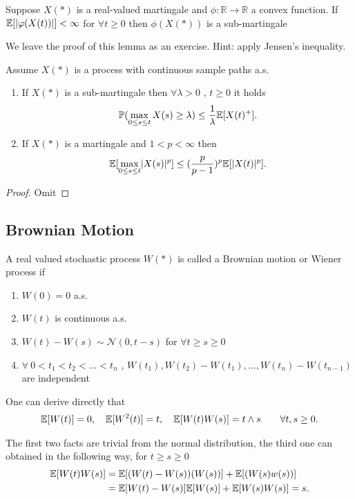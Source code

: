 \begin{lemma}
  Suppose $X(*)$ is a real-valued martingale and $\phi  : \mathbb{R} \to  \mathbb{R}$ a convex function.
  If $\mathbb{E}[\lvert\varphi(X(t))\rvert] < \infty $ for $\forall  t\ge 0$ then $\phi(X(*))$ is a sub-martingale
\end{lemma}
We leave the proof of this lemma as an exercise. Hint: apply Jensen's inequality.
\vskip5mm
\begin{theorem}
 Assume $X(*)$  is a process with continuous sample paths a.s. 
 \begin{enumerate}
   \item If $X(*)$ is a sub-martingale then $\forall  \lambda > 0$ , $t \ge 0$ it holds 
     \begin{align*}
       \mathbb{P}(\max_{0\le s\le t} X(s) \ge \lambda ) \le  \frac{1}{\lambda }\mathbb{E}[X(t)^{+} ]
     .\end{align*}
    \item If $X(*)$ is a martingale and $1 < p < \infty$ then
      \begin{align*}
        \mathbb{E}[\max_{0\le s\le t} \lvert X(s) \rvert^{p} ] \le (\frac{p}{p-1})^{p} \mathbb{E}[\lvert X(t)\rvert^{p} ]
      .\end{align*}
 \end{enumerate}
\end{theorem}
\begin{proof}
 Omit 
\end{proof}
\subsection{Brownian Motion}
\begin{definition}
 A real valued stochastic process $W(*)$ is called a Brownian motion 
 or Wiener process if 
 \begin{enumerate}
   \item $W(0) = 0$ a.s.
   \item $W(t)$ is continuous a.s.
   \item $W(t) - W(s) \sim \mathcal{N}(0,t-s)$ for $\forall t\ge s\ge 0$
   \item $\forall \ 0 < t_{1}<t_{2}<\ldots <t_n$ , $W(t_{1}),W(t_{2})-W(t_{1}),\ldots ,W(t_n)-W(t_{n-1})$ are independent 
 \end{enumerate}
\end{definition}
\begin{remark}
 One can derive directly that 
 \begin{align*}
   \mathbb{E}[W(t)] = 0, \quad \mathbb{E}[W^2(t)] = t, \quad \mathbb{E}[W(t)W(s)] = t\land s\qquad \forall t,s \ge 0
 .\end{align*}
\end{remark}
The first two facts are trivial from the normal distribution, the third one can obtained in the following way, for $t\ge s\geq 0$ 
\begin{align*}
  \mathbb{E}[W(t)W(s)] &= \mathbb{E}[(W(t)-W(s))(W(s))]+\mathbb{E}[(W(s)w(s))]\\
               &= \mathbb{E}[W(t)-W(s)]\mathbb{E}[W(s)] + \mathbb{E}[W(s)W(s)] = s
.\end{align*}

